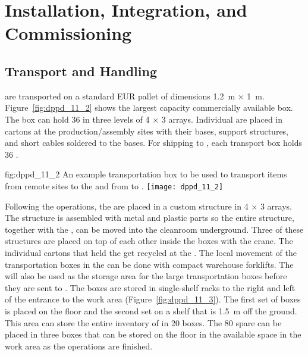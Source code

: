 \section{Installation, Integration, and Commissioning}
\label{sec:dp-pds-installation}

\subsection{Transport and Handling}

 are transported on a standard EUR pallet of dimensions \SI{1.2}{\m} $\times$ \SI{1}{\m}. Figure~\ref{fig:dppd_11_2} shows the largest capacity commercially available box. The box can hold \num{36}  in three levels of \num{4} $\times$ \num{3} arrays. Individual  are placed in cartons at the production/assembly sites with their bases, support structures, and short  cables soldered to the bases. For shipping to , each transport box holds \num{36} . 

\begin{dunefigure}{fig:dppd_11_2}
{An example transportation box to be used to transport items from remote sites to the  and from  to \surf.}
\texttt{[image: dppd\_11\_2]}
\end{dunefigure}

Following the  operations, the  are placed in a custom structure in \num{4} $\times$ \num{3} arrays. The structure is assembled with metal and plastic parts so the entire structure, together with the , can be moved into the cleanroom underground. Three of these structures are placed on top of each other inside the boxes with the crane. The individual cartons that held the  get recycled at the . The local movement of the transportation boxes in the  can be done with compact warehouse forklifts. The  will also be used as the storage area for the large  transportation boxes before they are sent to . The boxes are stored in single-shelf racks to the right and left of the entrance to the work area (Figure~\ref{fig:dppd_11_3}). The first set of boxes is placed on the floor and the second set on a shelf that is \SI{1.5}{\m} off the ground. This area can store the entire \dual {}  inventory of \dpnumpmtch {} in \num{20} boxes. The \num{80} spare  can be placed in three boxes that can be stored on the floor in the available space in the work area as the \dual {}  operations are finished.

